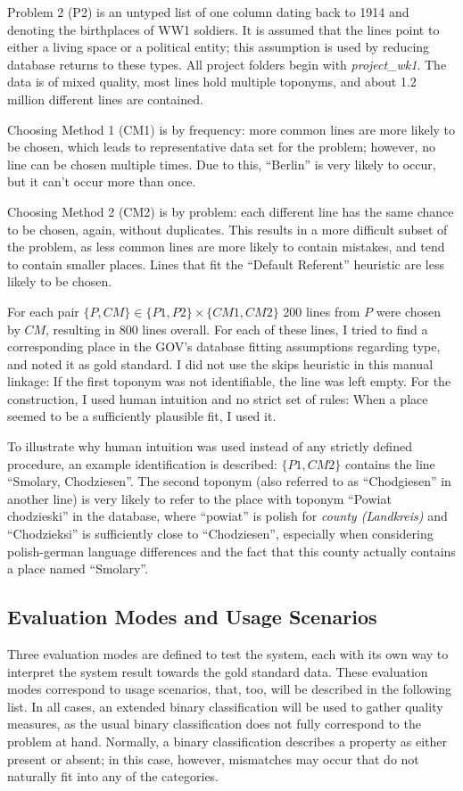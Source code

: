 \documentclass[11pt]{article}
\begin{document}
Problem 2 (P2) is an untyped list of one column dating back to 1914 and denoting the birthplaces of WW1 soldiers. It is assumed that the lines point to either a living space or a political entity; this assumption is used by reducing database returns to these types. All project folders begin with \emph{project\_wk1}. The data is of mixed quality, most lines hold multiple toponyms, and about 1.2 million different lines are contained.

Choosing Method 1 (CM1) is by frequency: more common lines are more likely to be chosen, which leads to representative data set for the problem; however, no line can be chosen multiple times. Due to this, ``Berlin'' is very likely to occur, but it can't occur more than once.

Choosing Method 2 (CM2) is by problem: each different line has the same chance to be chosen, again, without duplicates. This results in a more difficult subset of the problem, as less common lines are more likely to contain mistakes, and tend to contain smaller places. Lines that fit the ``Default Referent'' heuristic are less likely to be chosen.

For each pair $\{P, CM\} \in \{P1, P2\} \times \{CM1, CM2\}$ 200 lines from $P$ were chosen by $CM$, resulting in 800 lines overall. For each of these lines, I tried to find a corresponding place in the GOV's database fitting assumptions regarding type, and noted it as gold standard. I did not use the skips heuristic in this manual linkage: If the first toponym was not identifiable, the line was left empty. For the construction, I used human intuition and no strict set of rules: When a place seemed to be a sufficiently plausible fit, I used it.

To illustrate why human intuition was used instead of any strictly defined procedure, an example identification is described: $\{P1, CM2\}$ contains the line ``Smolary, Chodziesen''. The second toponym (also referred to as ``Chodgiesen'' in another line) is very likely to refer to the place with toponym ``Powiat chodzieski'' in the database, where ``powiat'' is polish for \emph{county (Landkreis)} and ``Chodzieksi'' is sufficiently close to ``Chodziesen'', especially when considering polish-german language differences and the fact that this county actually contains a place named ``Smolary''.

\subsection{Evaluation Modes and Usage Scenarios}
Three evaluation modes are defined to test the system, each with its own way to interpret the system result towards the gold standard data. These evaluation modes correspond to usage scenarios, that, too, will be described in the following list. In all cases, an extended binary classification will be used to gather quality measures, as the usual binary classification does not fully correspond to the problem at hand. Normally, a binary classification describes a property as either present or absent; in this case, however, mismatches may occur that do not naturally fit into any of the categories.
\end{document}
